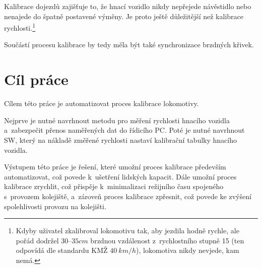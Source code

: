 Kalibrace dojezdů zajišťuje to, že hnací vozidlo nikdy nepřejede návěstidlo nebo
nenajede do špatně postavené výměny. Je proto ještě důležitější než kalibrace
rychlosti.\footnote{Kdyby uživatel zkalibroval lokomotivu tak, aby jezdila
hodně rychle, ale pořád dodržel $30$--$35cm$ brzdnou vzdálenost z~rychlostního
stupně 15 (ten odpovídá dle standardu KMŽ $40\ km/h$), lokomotiva nikdy nevjede,
kam nemá.}

Součástí procesu kalibrace by tedy měla být také synchronizace brzdných křivek.

\section{Cíl práce}
\label{sec:cil}

Cílem této práce je automatizovat proces kalibrace lokomotivy.

Nejprve je nutné navrhnout metodu pro měření rychlosti hnacího vozidla
a~zabezpečit přenos naměřených dat do řídicího PC. Poté je nutné navrhnout SW,
který na nákladě změřené rychlosti nastaví kalibrační tabulky hnacího vozidla.

Výstupem této práce je řešení, které umožní proces kalibrace především
automatizovat, což povede k~ušetření lidských kapacit. Dále umožní proces
kalibrace zrychlit, což přispěje k~minimalizaci režijního času spojeného
s~provozem kolejiště, a~zároveň proces kalibrace zpřesnit, což povede ke
zvýšení spolehlivosti provozu na kolejišti.

